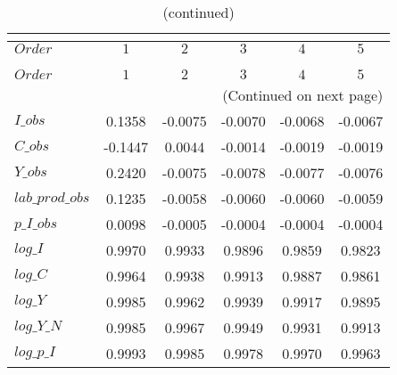  
\begin{center}
\begin{longtable}{lccccc} 
\caption{COEFFICIENTS OF AUTOCORRELATION}\\
 \label{Table:th_autocorr_matrix}\\
\toprule 
$Order           $	 & 	 $          1$	 & 	 $          2$	 & 	 $          3$	 & 	 $          4$	 & 	 $          5$\\
\midrule \endfirsthead 
\caption{(continued)}\\
 \toprule \\ 
$Order           $	 & 	 $          1$	 & 	 $          2$	 & 	 $          3$	 & 	 $          4$	 & 	 $          5$\\
\midrule \endhead 
\midrule \multicolumn{6}{r}{(Continued on next page)} \\ \bottomrule \endfoot 
\bottomrule \endlastfoot 
$I\_obs          $	 & 	     0.1358	 & 	    -0.0075	 & 	    -0.0070	 & 	    -0.0068	 & 	    -0.0067 \\ 
$C\_obs          $	 & 	    -0.1447	 & 	     0.0044	 & 	    -0.0014	 & 	    -0.0019	 & 	    -0.0019 \\ 
$Y\_obs          $	 & 	     0.2420	 & 	    -0.0075	 & 	    -0.0078	 & 	    -0.0077	 & 	    -0.0076 \\ 
$lab\_prod\_obs  $	 & 	     0.1235	 & 	    -0.0058	 & 	    -0.0060	 & 	    -0.0060	 & 	    -0.0059 \\ 
$p\_I\_obs       $	 & 	     0.0098	 & 	    -0.0005	 & 	    -0.0004	 & 	    -0.0004	 & 	    -0.0004 \\ 
$log\_I          $	 & 	     0.9970	 & 	     0.9933	 & 	     0.9896	 & 	     0.9859	 & 	     0.9823 \\ 
$log\_C          $	 & 	     0.9964	 & 	     0.9938	 & 	     0.9913	 & 	     0.9887	 & 	     0.9861 \\ 
$log\_Y          $	 & 	     0.9985	 & 	     0.9962	 & 	     0.9939	 & 	     0.9917	 & 	     0.9895 \\ 
$log\_Y\_N       $	 & 	     0.9985	 & 	     0.9967	 & 	     0.9949	 & 	     0.9931	 & 	     0.9913 \\ 
$log\_p\_I       $	 & 	     0.9993	 & 	     0.9985	 & 	     0.9978	 & 	     0.9970	 & 	     0.9963 \\ 
\end{longtable}
 \end{center}
